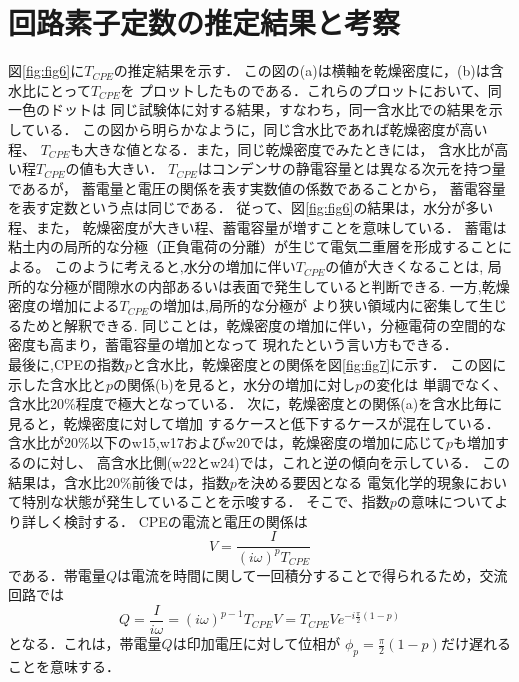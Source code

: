 \documentclass{jsce}
\begin{document}
\section{回路素子定数の推定結果と考察}
図\ref{fig:fig6}に$T_{CPE}$の推定結果を示す．
この図の(a)は横軸を乾燥密度に，(b)は含水比にとって$T_{CPE}$を
プロットしたものである．これらのプロットにおいて、同一色のドットは
同じ試験体に対する結果，すなわち，同一含水比での結果を示している．
この図から明らかなように，同じ含水比であれば乾燥密度が高い程、
$T_{CPE}$も大きな値となる．また，同じ乾燥密度でみたときには，
含水比が高い程$T_{CPE}$の値も大きい．
$T_{CPE}$はコンデンサの静電容量とは異なる次元を持つ量であるが，
蓄電量と電圧の関係を表す実数値の係数であることから，
蓄電容量を表す定数という点は同じである．
従って、図\ref{fig:fig6}の結果は，水分が多い程、また，
乾燥密度が大きい程、蓄電容量が増すことを意味している．
蓄電は粘土内の局所的な分極（正負電荷の分離）が生じて電気二重層を形成することによる。
このように考えると,水分の増加に伴い$T_{CPE}$の値が大きくなることは,
局所的な分極が間隙水の内部あるいは表面で発生していると判断できる.
一方,乾燥密度の増加による$T_{CPE}$の増加は,局所的な分極が
より狭い領域内に密集して生じるためと解釈できる.
同じことは，乾燥密度の増加に伴い，分極電荷の空間的な密度も高まり，蓄電容量の増加となって
現れたという言い方もできる．\\
\hspace{\parindent}
最後に,CPEの指数$p$と含水比，乾燥密度との関係を図\ref{fig:fig7}に示す．
この図に示した含水比と$p$の関係(b)を見ると，水分の増加に対し$p$の変化は
単調でなく、含水比20\%程度で極大となっている．
次に，乾燥密度との関係(a)を含水比毎に見ると，乾燥密度に対して増加
するケースと低下するケースが混在している．
含水比が20\%以下のw15,w17およびw20では，乾燥密度の増加に応じて$p$も増加するのに対し、
高含水比側(w22とw24)では，これと逆の傾向を示している．
この結果は，含水比20\%前後では，指数$p$を決める要因となる
電気化学的現象において特別な状態が発生していることを示唆する．
そこで、指数$p$の意味についてより詳しく検討する．
CPEの電流と電圧の関係は
\begin{equation}
	V=\frac{I}{(i\omega )^pT_{CPE}}
	\label{eqn:}
\end{equation}
である．帯電量$Q$は電流を時間に関して一回積分することで得られるため，交流回路では
\begin{equation}
	Q=\frac{I}{i \omega}=(i\omega)^{p-1}T_{CPE}V=T_{CPE}Ve^{-i\frac{\pi}{2}(1-p)}
	\label{eqn:}
\end{equation}
となる．これは，帯電量$Q$は印加電圧に対して位相が
$\phi_p=\frac{\pi}{2}(1-p)$だけ遅れることを意味する．
\end{document}
